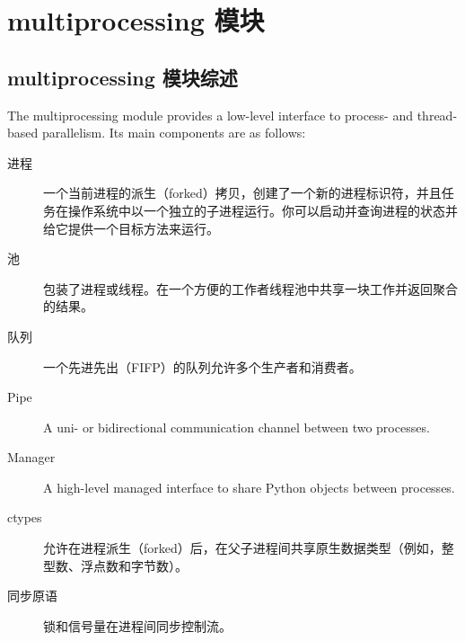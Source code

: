 \chapter{multiprocessing 模块\label{ch09}}
\section{multiprocessing 模块综述}
The multiprocessing module provides a low-level interface to process- and thread-based parallelism. Its main components are as follows:
\begin{description}
    \item[进程]一个当前进程的派生（forked）拷贝，创建了一个新的进程标识符，并且任务在操作系统中以一个独立的子进程运行。你可以启动并查询进程的状态并给它提供一个目标方法来运行。
    \item[池]包装了进程或线程。在一个方便的工作者线程池中共享一块工作并返回聚合的结果。
    \item[队列]一个先进先出（FIFP）的队列允许多个生产者和消费者。
    \item[Pipe]A uni- or bidirectional communication channel between two processes.
    \item[Manager]A high-level managed interface to share Python objects between processes.
    \item[ctypes]允许在进程派生（forked）后，在父子进程间共享原生数据类型（例如，整型数、浮点数和字节数）。
    \item[同步原语]锁和信号量在进程间同步控制流。
\end{description}